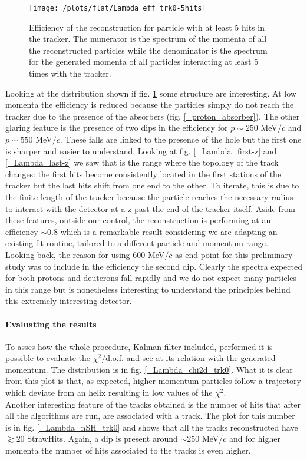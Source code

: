 \documentclass[12pt,a4paper,openright, oneside, titlepage]{book} %
\begin{document}
\begin{figure}[h!]
\centering
\texttt{[image: /plots/flat/Lambda\_eff\_trk0-5hits]}
\caption{Efficiency of the reconstruction for particle with at least 5 hits in the tracker. The numerator is the spectrum of the momenta of all the reconstructed particles while the denominator is the spectrum for the generated momenta of all particles interacting at least 5 times with the tracker.}
\label{_Lambda_eff_trk0-5hits}
\end{figure}

\noindent Looking at the distribution shown if fig. \ref{_Lambda_eff_trk0-5hits} some structure are interesting. At low momenta the efficiency is reduced because the particles simply do not reach the tracker due to the presence of the absorbers (fig. \ref{_proton_absorber}). 
The other glaring feature is the presence of two dips in the efficiency for $p\sim250$ MeV$/c$ and $p\sim550$ MeV$/c$. 
These falls are linked to the presence of the hole but the first one is sharper and easier to understand. Looking at fig. \ref{_Lambda_first-z} and \ref{_Lambda_last-z} we saw that is the range where the topology of the track changes: the first hits become consistently located in the first stations of the tracker but the last hits shift from one end to the other. 
To iterate, this is due to the finite length of the tracker because the particle reaches the necessary radius to interact with the detector at a z past the end of the tracker itself.
Aside from these features, outside our control, the reconstruction is performing at an efficiency $\sim 0.8$ which is a remarkable result considering we are adapting an existing fit routine, tailored to a different particle and momentum range.\\

\noindent Looking back, the reason for using 600 MeV$/c$ as end point for this preliminary study was to include in the efficiency the second dip. 
Clearly the spectra expected for both protons and deuterons fall rapidly and we do not expect many particles in this range but is nonetheless interesting to understand the principles behind this extremely interesting detector.

\paragraph{Evaluating the results} 
To asses how the whole procedure, Kalman filter included, performed it is possible to evaluate the $\chi^2/\textrm{d.o.f.}$ and see at its relation with the generated momentum. The distribution is in fig. \ref{_Lambda_chi2d_trk0}. What it is clear from this plot is that, as expected, higher momentum particles follow a trajectory which deviate from an helix resulting in low values of the $\chi^2$. \\
Another interesting feature of the tracks obtained is the number of hits that after all the algorithms are run, are associated with a track. The plot for this number is in fig. \ref{_Lambda_nSH_trk0} and shows that all the tracks reconstructed have $\gtrsim 20$ StrawHits. Again, a dip is present around $\sim 250$ MeV$/c$ and for higher momenta the number of hits associated to the tracks is even higher.
\end{document}
